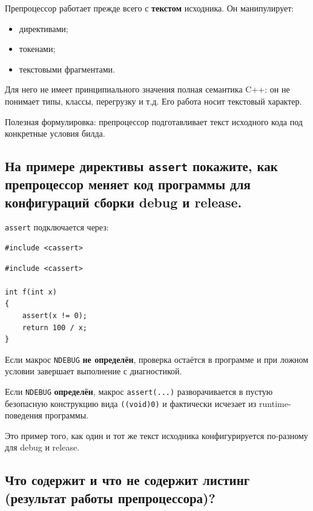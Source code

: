 Препроцессор работает прежде всего с \textbf{текстом} исходника. Он манипулирует:
\begin{itemize}
    \item директивами;
    \item токенами;
    \item текстовыми фрагментами.
\end{itemize}

Для него не имеет принципиального значения полная семантика C++: он не понимает типы, классы, перегрузку и т.д. Его работа носит текстовый характер.

\begin{remark}
Полезная формулировка: препроцессор подготавливает текст исходного кода под конкретные условия билда.
\end{remark}


\subsection{На примере директивы \texttt{assert} покажите, как препроцессор меняет код программы для конфигураций сборки debug и release.}

\texttt{assert} подключается через:
\begin{verbatim}
#include <cassert>
\end{verbatim}

\begin{example}
\begin{verbatim}
#include <cassert>

int f(int x)
{
    assert(x != 0);
    return 100 / x;
}
\end{verbatim}
\end{example}

Если макрос \texttt{NDEBUG} \textbf{не определён}, проверка остаётся в программе и при ложном условии завершает выполнение с диагностикой.

Если \texttt{NDEBUG} \textbf{определён}, макрос \texttt{assert(...)} разворачивается в пустую безопасную конструкцию вида \texttt{((void)0)} и фактически исчезает из runtime-поведения программы.

Это пример того, как один и тот же текст исходника конфигурируется по-разному для debug и release.


\subsection{Что содержит и что не содержит листинг (результат работы препроцессора)?}

